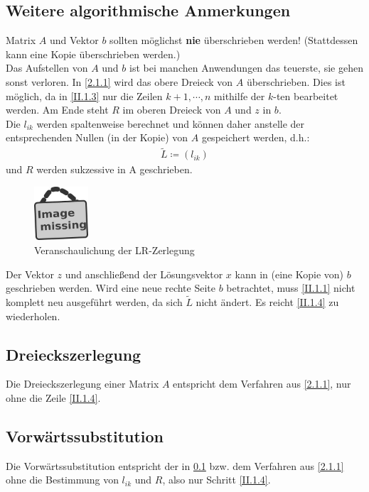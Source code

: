 \documentclass[ngerman,fontsize=11pt, paper=a4, parskip=half, titlepage=true, toc=bib]{scrbook}
\begin{document}
\subsection{Weitere algorithmische Anmerkungen}	\label{2.1.4}
Matrix $A$ und Vektor $b$ sollten möglichst \textbf{nie} überschrieben werden! (Stattdessen kann eine Kopie überschrieben werden.) \\
Das Aufstellen von $A$ und $b$ ist bei manchen Anwendungen das teuerste, sie gehen sonst verloren. In \ref{2.1.1} wird das obere Dreieck von $A$ überschrieben. Dies ist möglich, da in \eqref{II.1.3} nur die Zeilen $k+1, \cdots, n$ mithilfe der $k$-ten bearbeitet werden. Am Ende steht $R$ im oberen Dreieck von $A$ und $z$ in $b$. \\
Die $l_{ik}$ werden spaltenweise berechnet und können daher anstelle der entsprechenden Nullen (in der Kopie) von $A$ gespeichert werden, d.h.:
\begin{gather}
	\widetilde{L} \coloneqq (l_{ik})  \label{II.1.8}
\end{gather}
und $R$ werden sukzessive in A geschrieben. 
\begin{figure}
	\parbox{\linewidth}{
		\centering
		\includegraphics[width=2cm]{images/image_missing.jpg}
		}
	\caption{Veranschaulichung der LR-Zerlegung}
	\label{2.1.3.im1}
\end{figure}
Der Vektor $z$ und anschließend der Lösungsvektor $x$ kann in (eine Kopie von) $b$ geschrieben werden.
Wird eine neue rechte Seite $b$ betrachtet, muss \ref{II.1.1} nicht komplett neu ausgeführt werden, da sich $\widetilde{L}$ nicht ändert. Es reicht \ref{II.1.4} zu wiederholen. \\


\subsection{Dreieckszerlegung} \label{2.1.5} 
Die Dreieckszerlegung einer Matrix $A$ entspricht dem Verfahren aus \ref{2.1.1}, nur ohne die Zeile \eqref{II.1.4}.

\subsection{Vorwärtssubstitution} 
Die Vorwärtssubstitution entspricht der in \ref{2.1.4} bzw. dem Verfahren aus \ref{2.1.1} ohne die Bestimmung von $l_{ik}$ und $R$, also nur Schritt \eqref{II.1.4}.
\end{document}
